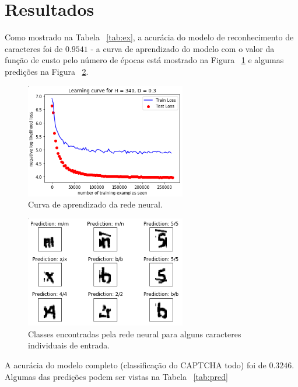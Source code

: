 \documentclass[11pt]{article}
\begin{document}
\section{Resultados}

Como mostrado na Tabela ~\ref{tab:ex}, a acurácia do modelo de reconhecimento de caracteres foi de $0.9541$ - a curva de aprendizado do modelo com o valor da função de custo pelo número de épocas está mostrado na Figura ~\ref{fig:learning} e algumas predições na Figura ~\ref{fig:pred}.

  \begin{figure}[H]
        {\centering
        \includegraphics[width=70mm]{images/learning.png}
        \caption{Curva de aprendizado da rede neural.}
        \label{fig:learning}\par}
  \end{figure}

  \begin{figure}[H]
        {\centering
        \includegraphics[width=70mm]{images/pred.png}
        \caption{Classes encontradas pela rede neural para alguns caracteres individuais de entrada.}
        \label{fig:pred}\par}
\end{figure}

A acurácia do modelo completo (classificação do CAPTCHA todo) foi de $0.3246$. Algumas das predições podem ser vistas na Tabela ~\ref{tab:pred} 
\end{document}
